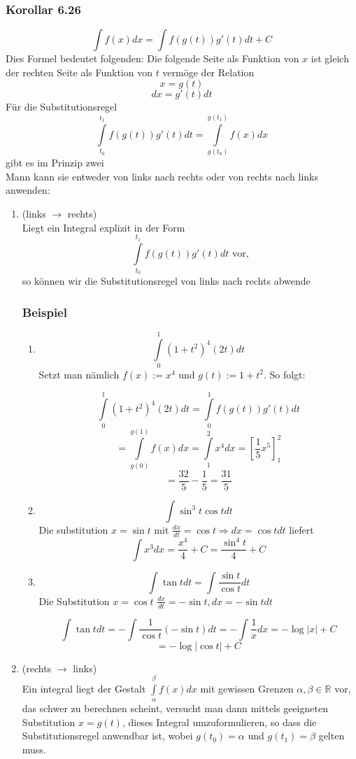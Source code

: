 \subsubsection*{Korollar 6.26}
\[\int {f(x)dx = \int {f\left( {g(t)} \right)} g'(t)dt + C} \]
Dies Formel bedeutet folgenden: Die folgende Seite als Funktion von $x$ ist gleich der rechten Seite als Funktion von $t$ vermöge der Relation $$x=g(t)$$$$dx=g'(t)dt$$
Für die Substitutionsregel 
\[\int\limits_{{t_0}}^{{t_1}} {f\left( {g(t)} \right)g'(t)dt = \int\limits_{g({t_0})}^{g({t_1})} {f(x)dx} } \]
gibt es im Prinzip zwei \\

\noindent Mann kann sie entweder von links nach rechts oder von rechts nach links anwenden: 
\begin{enumerate}
\item (links $\rightarrow$ rechts)\\
Liegt ein Integral explizit in der Form \[\int\limits_{{t_0}}^{{t_1}} {f\left( {g(t)} \right)g'(t)dt} \text{ vor,}\] so können wir die Substitutionsregel von links nach rechts abwende
\subsubsection*{Beispiel}
\begin{enumerate}
\item \[\int\limits_0^1 {{{(1 + {t^2})}^4}(2t)dt} \] Setzt man nämlich $f(x):=x^4$ und $g(t):=1+t^2$. So folgt:

\[\int\limits_0^1 {{{(1 + {t^2})}^4}(2t)dt}  = \int\limits_0^1 {f\left( {g(t)} \right)g'(t)dt} \]
\[ = \int\limits_{g(0)}^{g(1)} {f(x)dx = } \int\limits_1^2 {{x^4}dx = \left[ {\frac{1}{5}{x^5}} \right]_1^2} \]
\[ = \frac{{32}}{5} - \frac{1}{5} = \frac{{31}}{5}\]



\item \[\int {{{\sin }^3}t\cos t dt} \] Die substitution $x=\sin t$ mit $\frac{dx}{dt}=\cos t \Rightarrow dx=\cos t dt$ liefert \[\int {{x^3}dx = \frac{{{x^4}}}{4} + C = \frac{{{{\sin }^4}t}}{4}}  + C\]
\item \[\int {\tan tdt = \int {\frac{{\sin t}}{{\cos t}}dt} } \] Die Substitution $x=\cos t$ $\frac{dx}{dt}=-\sin t, dx=-\sin t dt$ 

\[\int {\tan tdt =  - \int {\frac{1}{{\cos t}}( - \sin t)dt =  - \int {\frac{1}{x}} } } dx =  - \log \left| x \right| + C\]
\[ =  - \log \left| {\cos t} \right| + C\]

\end{enumerate}
\item (rechts $\rightarrow$ links)\\
Ein integral liegt der Gestalt $\int\limits_\alpha ^\beta  {f(x)dx}$ mit gewissen Grenzen $\alpha,\beta\in\mathbb{R}$ vor, das schwer zu berechnen scheint, versucht man dann mittels geeigneten Substitution $x=g(t)$, dieses Integral umzuformulieren, so dass die Substitutionsregel anwendbar ist, wobei $g(t_0)=\alpha$ und $g(t_1)=\beta$ gelten muss. 

\end{enumerate}
